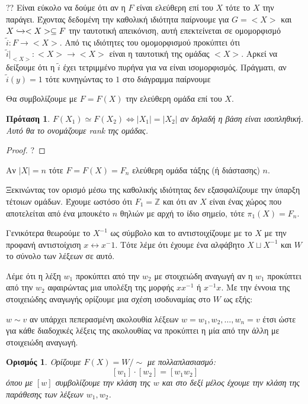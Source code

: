 \documentclass[oneside,a4paper]{article}
\newtheorem*{defn}{Ορισμός}
\newtheorem{prop}{Πρόταση}
\newcommand {\tl}{\textlatin}
\newcommand{\Z}{\mathbb{Z}}
\begin{document}
??
\noindent Είναι εύκολο να δούμε ότι αν η $F$ είναι ελεύθερη επί του $X$ τότε το $X$ την παράγει. Έχοντας δεδομένη την καθολική ιδιότητα παίρνουμε για $G=<X>$ και $X \xhookrightarrow{} <X> \subseteq F$ την ταυτοτική απεικόνιση, αυτή επεκτείνεται σε ομομορφισμό $\tilde{i} : F \rightarrow <X>$. Από τις ιδιότητες του ομομορφισμού προκύπτει ότι $\tilde{i}|_{<X>} : <X> \rightarrow <X>$ είναι η ταυτοτική της ομάδας $<X>$. Αρκεί να δείξουμε ότι η $\tilde{i}$ έχει τετριμμένο πυρήνα για να είναι ισομορφισμός. Πράγματι, αν $\tilde{i}(y) = 1$ τότε κυνηγώντας το $1$ στο διάγραμμα παίρνουμε 

\noindent Θα συμβολίζουμε με $F = F(X)$ την ελεύθερη ομάδα επί του $X$.

\begin{prop}
	$F(X_1) \simeq F(X_2) \iff |X_1| = |X_2|$ αν δηλαδή η βάση είναι ισοπληθική. Αυτό θα το ονομάζουμε \tl{rank} της ομάδας.
\end{prop}



\begin{proof}
	?
\end{proof}


\noindent Αν $|X| = n$ τότε $F = F(X) = F_n$ ελεύθερη ομάδα τάξης (ή διάστασης) $n$.


\noindent Ξεκινώντας τον ορισμό μέσω της καθολικής ιδιότητας δεν εξασφαλίζουμε την ύπαρξη τέτοιων ομάδων. Έχουμε ωστόσο ότι $F_1 = \Z$ και ότι αν $X$ είναι ένας χώρος που αποτελείται από ένα μπουκέτο $n$ θηλιών με αρχή το ίδιο σημείο, τότε $\pi_1 (X) = F_n$.

\noindent Γενικότερα θεωρούμε το $X^{-1}$ ως σύμβολο και το αντιστοιχίζουμε με το $X$ με την προφανή αντιστοίχιση $x \leftrightarrow x^-1$. Τότε λέμε ότι έχουμε ένα αλφάβητο $X \sqcup X^{-1}$ και $W$ το σύνολο των λέξεων σε αυτό.

\noindent Λέμε ότι η λέξη $w_1$ προκύπτει από την $w_2$ με στοιχειώδη αναγωγή αν η $w_1$ προκύπτει από την $w_2$ αφαιρώντας μια υπολέξη της μορφής $x x^{-1}$ ή $x^{-1} x$. Με την έννοια της στοιχειώδης αναγωγής ορίζουμε μια σχέση ισοδυναμίας στο $W$ ως εξής:

$w \sim v$ αν υπάρχει πεπερασμένη ακολουθία λέξεων $w = w_1, w_2, \ldots, w_n = v$ έτσι ώστε για κάθε διαδοχικές λέξεις της ακολουθίας να προκύπτει η μία από την άλλη με στοιχειώδη αναγωγή. 

\begin{defn} Ορίζουμε $F(X) = W/\sim$ με πολλαπλασιασμό:
	$$[w_1]\cdot [w_2] = [w_1 w_2]$$
	όπου με $[w]$ συμβολίζουμε την κλάση της $w$ και στο δεξί μέλος έχουμε την κλάση της παράθεσης των λέξεων $w_1,w_2$.
\end{defn}
\end{document}
